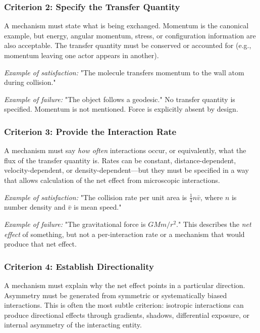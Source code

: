 \documentclass[12pt, a4paper]{article}
\begin{document}
\subsubsection{Criterion 2: Specify the Transfer Quantity}

A mechanism must state what is being exchanged. Momentum is the canonical example, but energy, angular momentum, stress, or configuration information are also acceptable. The transfer quantity must be conserved or accounted for (e.g., momentum leaving one actor appears in another).

\textit{Example of satisfaction:} "The molecule transfers momentum to the wall atom during collision."

\textit{Example of failure:} "The object follows a geodesic." No transfer quantity is specified. Momentum is not mentioned. Force is explicitly absent by design.

\subsubsection{Criterion 3: Provide the Interaction Rate}

A mechanism must say \textit{how often} interactions occur, or equivalently, what the flux of the transfer quantity is. Rates can be constant, distance-dependent, velocity-dependent, or density-dependent—but they must be specified in a way that allows calculation of the net effect from microscopic interactions.

\textit{Example of satisfaction:} "The collision rate per unit area is \( \frac{1}{4} n \bar{v} \), where \( n \) is number density and \( \bar{v} \) is mean speed."

\textit{Example of failure:} "The gravitational force is \( GMm/r^2 \)." This describes the \textit{net effect} of something, but not a per-interaction rate or a mechanism that would produce that net effect.

\subsubsection{Criterion 4: Establish Directionality}

A mechanism must explain why the net effect points in a particular direction. Asymmetry must be generated from symmetric or systematically biased interactions. This is often the most subtle criterion: isotropic interactions can produce directional effects through gradients, shadows, differential exposure, or internal asymmetry of the interacting entity.
\end{document}
